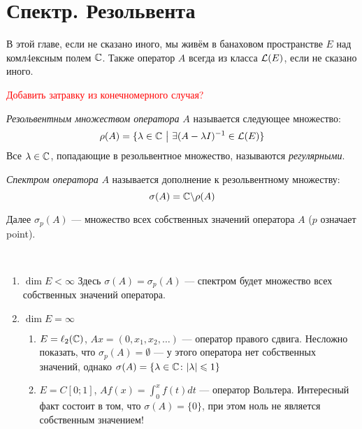 \section{Спектр. Резольвента}

\begin{note}
	В этой главе, если не сказано иного, мы живём в банаховом пространстве $E$ над комл4ексным полем $\mathbb{C}$. Также оператор $A$ всегда из класса $\mathcal{L}(E)$, если не сказано иного.
\end{note}

\textcolor{red}{Добавить затравку из конечномерного случая?}

\begin{definition}
	\textit{Резольвентным множеством оператора} $A$ называется следующее множество:
	\[
		\rho(A) = \{\lambda \in \mathbb{C} \ \big|\  \exists (A - \lambda I)^{-1} \in \mathcal{L}(E)\}
	\]
	Все $\lambda \in \mathbb{C}$, попадающие в резольвентное множество, называются \textit{регулярными}.
\end{definition}

\begin{definition}
	\textit{Спектром оператора} $A$ называется дополнение к резольвентному множеству:
	\[
		\sigma(A) = \mathbb{C} \backslash \rho(A)
	\]
\end{definition}

\begin{note}
	Далее $\sigma_p(A)$ --- множество всех собственных значений оператора $A$ ($p$ означает point).
\end{note}

\begin{example}~
	\begin{enumerate}
		\item $\dim E < \infty$ Здесь $\sigma(A) = \sigma_p(A)$ --- спектром будет множество всех собственных значений оператора.
		
		\item $\dim E = \infty$
		\begin{enumerate}
			\item $E = \ell_2(\mathbb{C})$, $Ax = (0, x_1, x_2, \ldots)$ --- оператор правого сдвига. Несложно показать, что $\sigma_p(A) = \emptyset$ --- у этого оператора нет собственных значений, однако   $\sigma(A) = \{\lambda \in \mathbb{C} \colon |\lambda| \leqslant 1\}$
			
			\item $E = C[0; 1]$, $Af(x) = \int_0^x f(t)dt$ --- оператор Вольтера. Интересный факт состоит в том, что $\sigma(A) = \{0\}$, при этом ноль не является собственным значением!
		\end{enumerate}
	\end{enumerate}
\end{example}


